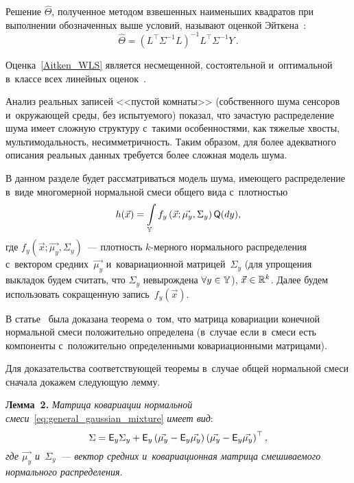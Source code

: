 \begin{multicols}{2}
Решение $\hat{\Theta}$, полученное методом взвешенных наименьших квадратов при 
выполнении обозначенных выше условий, называют оценкой Эйткена~\cite{app_regr}:
\begin{equation}
\label{Aitken_WLS}
\hat{\Theta} = \left(L^{\top}\Sigma^{-1}L\right)^{-1}L^{\top}\Sigma^{-1}Y\,.
\end{equation}

Оценка~\eqref{Aitken_WLS} является несмещенной, состоятельной и~оптимальной в~классе всех 
линейных оценок~\cite{app_regr}.


Анализ реальных записей <<пустой комнаты>> (собственного шума сенсоров и~окружающей среды, 
без испытуемого) показал, что зачастую распределение шума имеет сложную структуру с~такими 
особенностями, как тяжелые хвосты, мультимодальность, несимметричность. Таким образом, 
для более адекватного описания реальных данных требуется более сложная модель шума.


В данном разделе будет рассматриваться модель шума, имеющего распределение в~виде 
многомерной нормальной смеси общего вида с~плотностью
\begin{equation}
\label{eq:general_gaussian_mixture}
h(\vec{x}) = \int \limits_{\mathbb{Y}} f_y\left(\vec{x}; \vec{\mu_y}, \Sigma_y\right) {\sf Q}({d}y),
\end{equation}
где $f_y(\vec{x}; \vec{\mu_y}, \Sigma_y)$~--- плотность $k$-мер\-но\-го 
нормального распределения с~вектором средних~$\vec{\mu_y}$ и~ковариационной матрицей~$\Sigma_y$  
(для упрощения выкладок будем считать, что $\Sigma_y$ невырождена $\forall y \hm\in \mathbb{Y}$), 
$\vec{x}\hm \in \mathbb{R}^k$. Далее будем использовать сокращенную запись~$f_y(\vec{x})$.


В статье~\cite{simple_mix} была доказана теорема о~том, что матрица ковариации 
конечной нормальной смеси положительно определена (в~случае если в~смеси есть компоненты с~положительно 
определенными ковариационными матрицами).


Для доказательства соответствующей теоремы в~случае общей нормальной смеси сначала докажем 
следующую лемму.

\smallskip

\noindent
\textbf{Лемма~2.}
\textit{Матрица ковариации нормальной смеси}~\eqref{eq:general_gaussian_mixture} \textit{имеет вид}:
$$
\Sigma = {\sf E}_y \Sigma_y + {\sf E}_y \left(\vec{\mu_y} - {\sf E}_y\vec{\mu_y}\right)\left(\vec{\mu_y} - 
{\sf E}_y\vec{\mu_y}\right)^\top,
$$
\textit{где $\vec{\mu_y}$ и~$\Sigma_y$~--- 
вектор средних и~ковариационная мат\-ри\-ца смешиваемого нормального распределения}.



\end{multicols}

